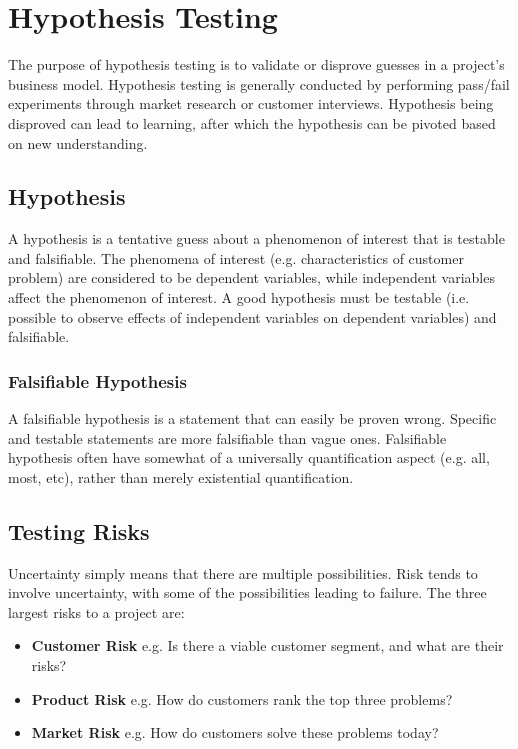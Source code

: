 \documentclass[12pt,titlepage]{article}
\begin{document}
  \section{Hypothesis Testing}
    The purpose of hypothesis testing is to validate or disprove guesses in a project's business model. Hypothesis testing is generally
    conducted by performing pass/fail experiments through market research or customer interviews. Hypothesis being disproved can lead
    to learning, after which the hypothesis can be pivoted based on new understanding.

    \subsection{Hypothesis}
      A hypothesis is a tentative guess about a phenomenon of interest that is testable and falsifiable. The phenomena of interest
      (e.g. characteristics of customer problem) are considered to be dependent variables, while independent variables affect the
      phenomenon of interest. A good hypothesis must be testable (i.e. possible to observe effects of independent variables on
      dependent variables) and falsifiable.

      \subsubsection{Falsifiable Hypothesis}
        A falsifiable hypothesis is a statement that can easily be proven wrong. Specific and testable statements are more falsifiable
        than vague ones. Falsifiable hypothesis often have somewhat of a universally quantification aspect (e.g. all, most, etc), rather
        than merely existential quantification.

    \subsection{Testing Risks}
      Uncertainty simply means that there are multiple possibilities. Risk tends to involve uncertainty, with some of the possibilities
      leading to failure. The three largest risks to a project are:
      \begin{itemize}
        \item \textbf{Customer Risk} e.g. Is there a viable customer segment, and what are their risks?
        \item \textbf{Product Risk} e.g. How do customers rank the top three problems?
        \item \textbf{Market Risk} e.g. How do customers solve these problems today?
      \end{itemize}
\end{document}
